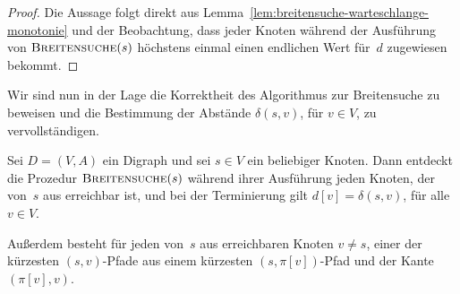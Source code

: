 \begin{proof}
Die Aussage folgt direkt aus Lemma~\ref{lem:breitensuche-warteschlange-monotonie} und der Beobachtung, dass jeder Knoten während der Ausführung von $\mathop{\text{\textsc{Breitensuche}}}(s)$ höchstens einmal einen endlichen Wert für~$d$ zugewiesen bekommt.
\end{proof}

\begin{bem}
Wir sind nun in der Lage die Korrektheit des Algorithmus zur Breitensuche zu beweisen und die Bestimmung der Abstände $\delta(s,v)$, für $v \in V$, zu vervollständigen.
\end{bem}

\begin{thm}
\label{thm:breitensuche}
Sei $D=(V,A)$ ein Digraph und sei $s \in V$ ein beliebiger Knoten.
Dann entdeckt die Prozedur $\mathop{\text{\textsc{Breitensuche}}}(s)$ während ihrer Ausführung jeden Knoten, der von~$s$ aus erreichbar ist, und bei der Terminierung gilt $d[v] = \delta(s,v)$, für alle $v \in V$.

Außerdem besteht für jeden von~$s$ aus erreichbaren Knoten $v \neq s$, einer der kürzesten $(s,v)$-Pfade aus einem kürzesten $(s,\pi[v])$-Pfad und der Kante $(\pi[v],v)$.
\end{thm}

